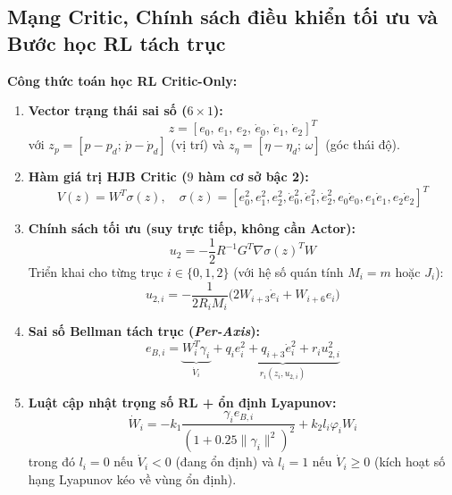 \documentclass[11pt,a4paper]{article}
\begin{document}
\subsection{Mạng Critic, Chính sách điều khiển tối ưu và Bước học RL tách trục}
\noindent
\begin{minipage}[t]{0.45\textwidth}
\vspace{0pt}
\textbf{Công thức toán học RL Critic-Only:}
\begin{enumerate}[leftmargin=1.3em, itemsep=0.25em]
    \item \textbf{Vector trạng thái sai số ($6\times 1$):}
    \[
    z = [e_0,\, e_1,\, e_2,\, \dot{e}_0,\, \dot{e}_1,\, \dot{e}_2]^T
    \]
    với $z_p = [p - p_d;\, \dot{p} - \dot{p}_d]$ (vị trí) và $z_\eta = [\eta - \eta_d;\, \omega]$ (góc thái độ).
    \item \textbf{Hàm giá trị HJB Critic ($9$ hàm cơ sở bậc 2):}
    \[
    V(z) = W^T \sigma(z), \quad \sigma(z) = [e_0^2, e_1^2, e_2^2, \dot{e}_0^2, \dot{e}_1^2, \dot{e}_2^2, e_0\dot{e}_0, e_1\dot{e}_1, e_2\dot{e}_2]^T
    \]
    \item \textbf{Chính sách tối ưu (suy trực tiếp, không cần Actor):}
    \[
    u_2 = -\frac{1}{2} R^{-1} G^T \nabla\sigma(z)^T W
    \]
    Triển khai cho từng trục $i \in \{0,1,2\}$ (với hệ số quán tính $M_i = m$ hoặc $J_i$):
    \[
    u_{2,i} = -\frac{1}{2 R_i M_i}\big(2 W_{i+3}\dot{e}_i + W_{i+6} e_i\big)
    \]
    \item \textbf{Sai số Bellman tách trục (\emph{Per-Axis}):}
    \[
    e_{B,i} = \underbrace{W_i^T \gamma_i}_{\dot{V}_i} + \underbrace{q_i e_i^2 + q_{i+3}\dot{e}_i^2 + r_i u_{2,i}^2}_{r_i(z_i, u_{2,i})}
    \]
    \item \textbf{Luật cập nhật trọng số RL + ổn định Lyapunov:}
    \[
    \dot{W}_i = -k_1 \frac{\gamma_i e_{B,i}}{(1 + 0.25\|\gamma_i\|^2)^2} + k_2 l_i \varphi_i W_i
    \]
    trong đó $l_i = 0$ nếu $\dot{V}_i < 0$ (đang ổn định) và $l_i = 1$ nếu $\dot{V}_i \ge 0$ (kích hoạt số hạng Lyapunov kéo về vùng ổn định).
\end{enumerate}
\end{minipage}
\hfill
\end{document}

